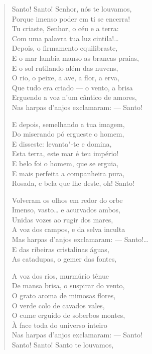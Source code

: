\medskip

\begin{verse}
Santo! Santo! Senhor, nós te louvamos,\\
Porque imenso poder em ti se encerra!\\
Tu criaste, Senhor, o céu e a terra:\\
Com uma palavra tua luz cintila!\ldots{}\\
Depois, o firmamento equilibraste,\\
E o mar lambia manso as brancas praias,\\
E o sol rutilando além das nuvens,\\
O rio, o peixe, a ave, a flor, a erva,\\
Que tudo era criado --- o vento, a brisa\\
Erguendo a voz n'um cântico de amores,\\
Nas harpas d'anjos exclamaram: --- Santo!

E depois, semelhando a tua imagem,\\
Do miserando pó ergueste o homem,\\
E disseste: levanta"-te e domina,\\
Esta terra, este mar é teu império!\\
E belo foi o homem, que se erguia,\\
E mais perfeita a companheira pura,\\
Rosada, e bela que lhe deste, oh! Santo!

Volveram os olhos em redor do orbe\\
Imenso, vasto\ldots{} e acurvados ambos,\\
Unidas vozes ao rugir dos mares,\\
A voz dos campos, e da selva inculta\\
Mas harpas d'anjos exclamaram: --- Santo!\ldots{}\\
E das ribeiras cristalinas águas,\\
As catadupas, o gemer das fontes,

A voz dos rios, murmúrio tênue\\
De mansa brisa, o suspirar do vento,\\
O grato aroma de mimosas flores,\\
O verde colo de cavados vales,\\
O cume erguido de soberbos montes,\\
À face toda do universo inteiro\\
Nas harpas d'anjos exclamaram: --- Santo!\\
Santo! Santo! Santo te louvamos,


\end{verse}
